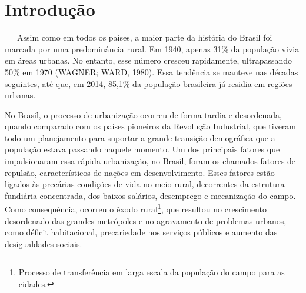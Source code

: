 \documentclass[
  12pt,
  a4paper,
]{scrreprt}
\renewcommand*\contentsname{Índice}
\newcommand\contentsname{Índice}
\renewcommand*\listfigurename{Lista de Figuras}
\newcommand\listfigurename{Lista de Figuras}
\renewcommand*\listtablename{Lista de Tabelas}
\newcommand\listtablename{Lista de Tabelas}
\begin{document}
\bgroup
\hypersetup{linkcolor = black}

\cleardoublepage
\renewcommand{\listfigurename}{\centering{Lista de Figuras}}
\listoffigures
\thispagestyle{empty}

\cleardoublepage
\renewcommand{\listtablename}{\centering{Lista de Tabelas}}
\listoftables
\thispagestyle{empty}

\cleardoublepage
\renewcommand{\listalgorithmname}{\centering{Lista de Algoritmos}}
\listofalgorithms
\thispagestyle{empty}

\cleardoublepage
\renewcommand{\contentsname}{\centering{Sumário}}
\tableofcontents
{}
\thispagestyle{empty}

\egroup

\chapter{Introdução}\label{introduuxe7uxe3o}

~~~Assim como em todos os países, a maior parte da história do Brasil
foi marcada por uma predominância rural. Em 1940, apenas 31\% da
população vivia em áreas urbanas. No entanto, esse número cresceu
rapidamente, ultrapassando 50\% em 1970 (WAGNER; WARD, 1980). Essa
tendência se manteve nas décadas seguintes, até que, em 2014, 85,1\% da
população brasileira já residia em regiões urbanas.

\vspace{12pt}

No Brasil, o processo de urbanização ocorreu de forma tardia e
desordenada, quando comparado com os países pioneiros da Revolução
Industrial, que tiveram todo um planejamento para suportar a grande
transição demográfica que a população estava passando naquele momento.
Um dos principais fatores que impulsionaram essa rápida urbanização, no
Brasil, foram os chamados fatores de repulsão, característicos de nações
em desenvolvimento. Esses fatores estão ligados às precárias condições
de vida no meio rural, decorrentes da estrutura fundiária concentrada,
dos baixos salários, desemprego e mecanização do campo. Como
consequência, ocorreu o êxodo rural\footnote{Processo de transferência
  em larga escala da população do campo para as cidades.}, que resultou
no crescimento desordenado das grandes metrópoles e no agravamento de
problemas urbanos, como déficit habitacional, precariedade nos serviços
públicos e aumento das desigualdades sociais.

\vspace{12pt}
\end{document}
